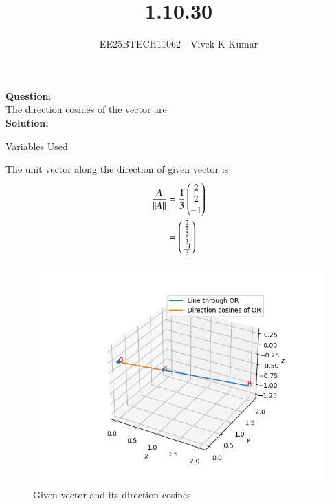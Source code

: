 \documentclass[journal]{IEEEtran}
\title{1.10.30}
\author{EE25BTECH11062 - Vivek K Kumar}
\begin{document}
\maketitle

\renewcommand{\thefigure}{\theenumi}
\renewcommand{\thetable}{\theenumi}


\textbf{Question}:\\
The direction cosines of the vector  are \underline{\hspace{0.1\columnwidth}}
\\
\textbf{Solution: }
\begin{table}[H]    
  \centering
  
  \caption{Variables Used}
  \label{tab:1.6.12}
\end{table}
The unit vector along the direction of given vector is\\
\begin{align}
\frac{A}{\left\lVert A\right\rVert} &= \frac{1}{3}\begin{pmatrix}2 \\ 2 \\ -1\end{pmatrix} \\
 &=\begin{pmatrix}\frac{2}{3} \\ \frac{2}{3} \\ \frac{-1}{3}\end{pmatrix}
\end{align}
\begin{figure}[H]
   \centering
  \includegraphics[width=0.64\columnwidth]{figs/fig.png}
   \caption{Given vector and its direction cosines}
   \label{stemplot}
\end{figure}
\end{document}

